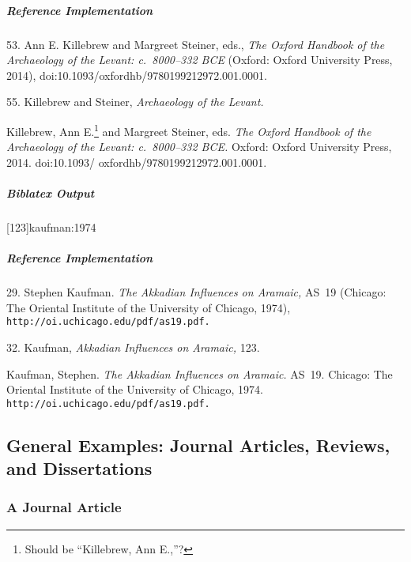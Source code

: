 \documentclass[a4paper]{article}
\newenvironment{biboutput}{%
  \subparagraph{Biblatex Output}
}{\color{black}}
\newenvironment{refimp}{%
  \subparagraph{Reference Implementation}
  \color{reference-colour}
  \rm
}{\par\color{black}}
\begin{document}
\begin{refimp}
  \hspace*{\bibindent}53. Ann E. Killebrew and Margreet Steiner, eds.,
  \emph{The Oxford Handbook of the Archaeology of the Levant: c.~8000–332 BCE}
  (Oxford: Oxford University Press, 2014),
  doi:10.1093/oxfordhb/9780199212972.001.0001.

  \hspace*{\bibindent}55. Killebrew and Steiner, \emph{Archaeology of the
  Levant.}

  \hangindent\bibindent Killebrew, Ann E.\footnote{Should be “Killebrew, Ann
  E.,”?} and Margreet Steiner, eds. \emph{The Oxford Handbook of the
  Archaeology of the Levant: c.~8000–332 BCE.} Oxford: Oxford University
  Press, 2014. doi:10.1093/ oxfordhb/9780199212972.001.0001.
\end{refimp}

\begin{biboutput}
  [123]{kaufman:1974}
\end{biboutput}

\begin{refimp}
  \hspace*{\bibindent}29. Stephen Kaufman. \emph{The Akkadian Influences on
  Aramaic,} AS~19 (Chicago: The Oriental Institute of the University of
  Chicago, 1974), \nolinkurl{http://oi.uchicago.edu/pdf/as19.pdf.}

  \hspace*{\bibindent}32. Kaufman, \emph{Akkadian Influences on Aramaic,} 123.

  \hangindent\bibindent Kaufman, Stephen. \emph{The Akkadian Influences on
  Aramaic.} AS~19. Chicago: The Oriental Institute of the University of
  Chicago, 1974. \nolinkurl{http://oi.uchicago.edu/pdf/as19.pdf.}

\end{refimp}

\subsection{General Examples: Journal Articles, Reviews, and Dissertations}

\subsubsection{A Journal Article}
\end{document}
